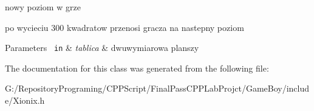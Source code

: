 nowy poziom w grze 

po wycieciu 300 kwadratow przenosi gracza na nastepny poziom 
\begin{DoxyParams}[1]{Parameters}
\mbox{\texttt{ in}}  & {\em tablica} & dwuwymiarowa planszy \\
\hline
\end{DoxyParams}


The documentation for this class was generated from the following file\+:\begin{DoxyCompactItemize}
\item 
G\+:/\+Repository\+Programing/\+C\+P\+P\+Script/\+Final\+Pass\+C\+P\+P\+Lab\+Projct/\+Game\+Boy/include/Xionix.\+h\end{DoxyCompactItemize}
